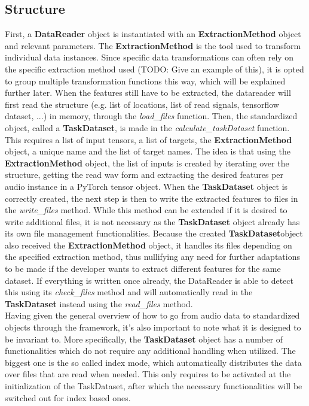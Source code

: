 \subsection{Structure} \label{Impl:DataRead:Structure}

First, a \textbf{DataReader} object is instantiated with an \textbf{ExtractionMethod} object and relevant parameters. The \textbf{ExtractionMethod} is the tool used to transform individual data instances. Since specific data transformations can often rely on the specific extraction method used (TODO: Give an example of this), it is opted to group multiple transformation functions this way, which will be explained further later. When the features still have to be extracted, the datareader will first read the structure (e.g. list of locations, list of read signals, tensorflow dataset, ...) in memory, through the \textit{load\_files} function. Then, the standardized object, called a \textbf{TaskDataset}, is made in the \textit{calculate\_taskDataset} function. This requires a list of input tensors, a list of targets, the \textbf{ExtractionMethod} object, a unique name and the list of target names. The idea is that using the \textbf{ExtractionMethod} object, the list of inputs is created by iterating over the structure, getting the read wav form and extracting the desired features per audio instance in a PyTorch tensor object. When the \textbf{TaskDataset} object is correctly created, the next step is then to write the extracted features to files in the \textit{write\_files} method. While this method can be extended if it is desired to write additional files, it is not necessary as the \textbf{TaskDataset} object already has its own file management functionalities. Because the created \textbf{TaskDataset}object also received the \textbf{ExtractionMethod} object, it handles its files depending on the specified extraction method, thus nullifying any need for further adaptations to be made if the developer wants to extract different features for the same dataset. If everything is written once already, the DataReader is able to detect this using its \textit{check\_files} method and will automatically read in the \textbf{TaskDataset} instead using the \textit{read\_files} method.\\
	
Having given the general overview of how to go from audio data to standardized objects through the framework, it's also important to note what it is designed to be invariant to. More specifically, the \textbf{TaskDataset} object has a number of functionalities which do not require any additional handling when utilized. The biggest one is the so called index mode, which automatically distributes the data over files that are read when needed. This only requires to be activated at the initialization of the TaskDataset, after which the necessary functionalities will be switched out for index based ones. \\

